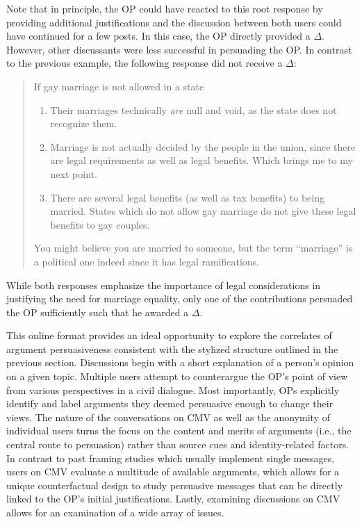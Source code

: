 Note that in principle, the OP could have reacted to this root response by providing additional justifications and the discussion between both users could have continued for a few posts. In this case, the OP directly provided a $\Delta$. However, other discussants were less successful in persuading the OP. In contrast to the previous example, the following response did not receive a $\Delta$:
\begin{quote}\singlespacing
If gay marriage is not allowed in a state
\begin{enumerate}
\item Their marriages technically \textit{are} null and void, as the state does not recognize them.
\item Marriage is not actually decided by the people in the union, since there are legal requirements as well as legal benefits. Which brings me to my next point.
\item There are several legal benefits (as well as tax benefits) to being married. States which do not allow gay marriage do not give these legal benefits to gay couples.      
\end{enumerate}
You might believe you are married to someone, but the term ``marriage'' is a political one indeed since it has legal ramifications.
\end{quote}
While both responses emphasize the importance of legal considerations in justifying the need for marriage equality, only one of the contributions persuaded the OP sufficiently such that he awarded a $\Delta$. 

This online format provides an ideal opportunity to explore the correlates of argument persuasiveness consistent with the stylized structure outlined in the previous section. Discussions begin with a short explanation of a person's opinion on a given topic. Multiple users attempt to counterargue the OP's point of view from various perspectives in a civil dialogue. Most importantly, OPs explicitly identify and label arguments they deemed persuasive enough to change their views. The nature of the conversations on CMV as well as the anonymity of individual users turns the focus on the content and merits of arguments (i.e., the central route to persuasion) rather than source cues and identity-related factors. In contrast to past framing studies which usually implement single messages, users on CMV evaluate a multitude of available arguments, which allows for a unique counterfactual design to study persuasive messages that can be directly linked to the OP's initial justifications. Lastly, examining discussions on CMV allows for an examination of a wide array of issues.

